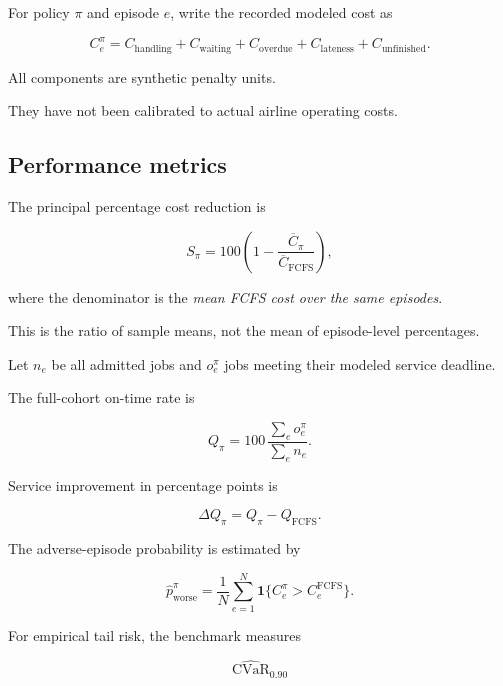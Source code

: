\documentclass[10pt,a4paper]{article}
\DeclareMathOperator{\CVaR}{CVaR}
\newcommand{\Ind}{\mathbf{1}}
\theoremstyle{plain}
\theoremstyle{definition}
\theoremstyle{remark}
\begin{document}
For policy \(\pi\) and episode \(e\),
write the recorded modeled cost as

\begin{equation}
C_e^\pi
=
C_{\mathrm{handling}}
+
C_{\mathrm{waiting}}
+
C_{\mathrm{overdue}}
+
C_{\mathrm{lateness}}
+
C_{\mathrm{unfinished}}.
\label{eq:ledger}
\end{equation}

All components are synthetic
penalty units.

They have not been calibrated
to actual airline operating costs.

\subsection{Performance metrics}

The principal percentage cost reduction is

\begin{equation}
S_\pi=
100
\left(
1-
\frac{
\overline C_\pi
}{
\overline C_{\mathrm{FCFS}}
}
\right),
\label{eq:savings}
\end{equation}

where the denominator is the
\emph{mean FCFS cost over the same episodes}.

This is the ratio of sample means,
not the mean of episode-level percentages.

Let \(n_e\) be all admitted jobs
and \(o_e^\pi\) jobs meeting
their modeled service deadline.

The full-cohort on-time rate is

\begin{equation}
Q_\pi=
100\,
\frac{\sum_e o_e^\pi}
{\sum_e n_e}.
\label{eq:ontime}
\end{equation}

Service improvement in percentage points is

\begin{equation}
\Delta Q_\pi=
Q_\pi-Q_{\mathrm{FCFS}}.
\label{eq:pp}
\end{equation}

The adverse-episode probability is estimated by

\begin{equation}
\widehat p_{\mathrm{worse}}^\pi
=
\frac1N
\sum_{e=1}^{N}
\Ind\{
C_e^\pi>C_e^{\mathrm{FCFS}}
\}.
\label{eq:regression}
\end{equation}

For empirical tail risk,
the benchmark measures

\[
\widehat{\CVaR}_{0.90}
\]
\end{document}

